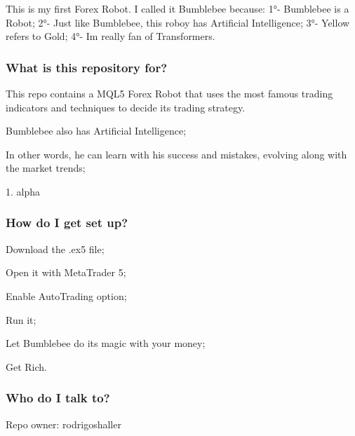 
\begin{DoxyItemize}
\item This is my first Forex Robot. I called it Bumblebee because\+: 1°-\/ Bumblebee is a Robot; 2°-\/ Just like Bumblebee, this roboy has Artificial Intelligence; 3°-\/ Yellow refers to Gold; 4°-\/ I\textquotesingle{}m really fan of Transformers.
\end{DoxyItemize}

\subsubsection*{What is this repository for?}


\begin{DoxyItemize}
\item This repo contains a M\+Q\+L5 Forex Robot that uses the most famous trading indicators and techniques to decide its trading strategy.
\item Bumblebee also has Artificial Intelligence;
\item In other words, he can learn with his success and mistakes, evolving along with the market trends;
\item 1. alpha
\end{DoxyItemize}

\subsubsection*{How do I get set up?}


\begin{DoxyItemize}
\item Download the .ex5 file;
\item Open it with Meta\+Trader 5;
\item Enable Auto\+Trading option;
\item Run it;
\item Let Bumblebee do its magic with your money;
\item Get Rich.
\end{DoxyItemize}

\subsubsection*{Who do I talk to?}


\begin{DoxyItemize}
\item Repo owner\+: rodrigoshaller 
\end{DoxyItemize}